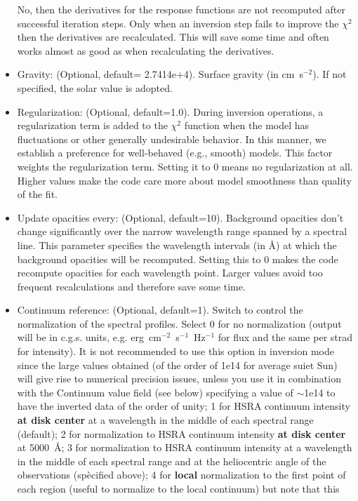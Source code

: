 \begin{itemize}
  No, then the derivatives for the response functions are not
  recomputed after successful iteration steps. Only when an inversion
  step fails to improve the $\chi^2$ then the derivatives are
  recalculated. This will save some time and often works almost as
  good as when recalculating the derivatives.
\item Gravity: (Optional, default= 2.7414e+4). Surface gravity (in
  cm~s$^{-2}$). If not specified, the solar value is adopted.
\item Regularization: (Optional, default=1.0). During inversion
  operations, a regularization term is added to the $\chi^2$ function
  when the model has fluctuations or other generally undesirable
  behavior. In this manner, we establish a preference for well-behaved
  (e.g., smooth) models. This factor weights the regularization
  term. Setting it to 0 means no regularization at all. Higher values
  make the code care more about model smoothness than quality of the
  fit.
\item Update opacities every: (Optional, default=10). Background
  opacities don't change significantly over the narrow wavelength
  range spanned by a spectral line. This parameter specifies the
  wavelength intervals (in \AA ) at which the background opacities
  will be recomputed. Setting this to 0 makes the code recompute
  opacities for each wavelength point. Larger values avoid too
  frequent recalculations and therefore save some time.
\item Continuum reference: (Optional, default=1). Switch to control
  the normalization of the spectral profiles.  Select 0 for no
  normalization (output will be in c.g.s. units,
  e.g. erg~cm$^{-2}$~s$^{-1}$~Hz$^{-1}$ for flux and the same per
  strad for intensity). It is not recommended to use this option in
  inversion mode since the large values obtained (of the order of 1e14
  for average suiet Sun) will give rise to numerical precision issues,
  unless you use it in combination with the Continuum value field (see
  below) specifying a value of $\sim$1e14 to have the inverted data of
  the order of unity; 1 for HSRA continuum intensity {\bf at disk
    center} at a wavelength in the middle of each spectral range
  (default); 2 for normalization to HSRA continuum intensity {\bf at
    disk center} at 5000~\AA ; 3 for normalization to HSRA continuum
  intensity at a wavelength in the middle of each spectral range and
  at the heliocentric angle of the observations (spècified above); 4
  for {\bf local} normalization to the first point of each region 
  (useful to normalize to the local continuum) but note that this

\end{itemize}
